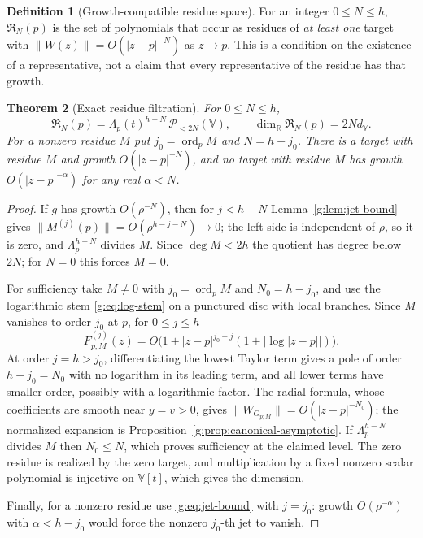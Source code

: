 \documentclass[11pt,a4paper]{article}
\numberwithin{equation}{section}
\newtheorem{theorem}{Theorem}[section]
\theoremstyle{definition}
\newtheorem{definition}[theorem]{Definition}
\theoremstyle{remark}
\theoremstyle{plain}
\newcommand{\RR}{\mathbb R}
\newcommand{\abs}[1]{\lvert #1\rvert}
\newcommand{\norm}[1]{\lVert #1\rVert}
\newcommand{\VV}{\mathbb V}                       %
\newcommand{\dV}{d_{\VV}}                         %
\newcommand{\Pol}[1]{\mathscr P_{<#1}(\VV)}       %
\newcommand{\Rq}{\Lambda}                         %
\newcommand{\Rfilt}{\mathfrak R}                  %
\DeclareMathOperator{\ord}{ord}
\begin{document}
\begin{definition}[Growth-compatible residue space]
\label{g:def:residue-space}
For an integer $0\le N\le h$, $\Rfilt_N(p)$ is the set of polynomials that occur
as residues of \emph{at least one} target with
$\norm{W(z)}=O(\abs{z-p}^{-N})$ as $z\to p$. This is a condition on the
existence of a representative, not a claim that every representative of the
residue has that growth.
\end{definition}

\begin{theorem}[Exact residue filtration]
\label{g:thm:filtration}
For $0\le N\le h$,
\begin{equation}\label{g:eq:filtration}
 \Rfilt_N(p)=\Rq_p(t)^{h-N}\,\Pol{2N},\qquad
 \dim_\RR\Rfilt_N(p)=2N\dV .
\end{equation}
For a nonzero residue $M$ put $j_0=\ord_pM$ and $N=h-j_0$. There is a target
with residue $M$ and growth $O(\abs{z-p}^{-N})$, and no target with residue
$M$ has growth $O(\abs{z-p}^{-\alpha})$ for any real $\alpha<N$.
\end{theorem}

\begin{proof}
If $g$ has growth $O(\rho^{-N})$, then for $j<h-N$ Lemma~\ref{g:lem:jet-bound}
gives $\norm{M^{(j)}(p)}=O(\rho^{h-j-N})\to0$; the left side is independent of
$\rho$, so it is zero, and $\Rq_p^{h-N}$ divides $M$. Since $\deg M<2h$ the
quotient has degree below $2N$; for $N=0$ this forces $M=0$.

For sufficiency take $M\ne0$ with $j_0=\ord_pM$ and $N_0=h-j_0$, and use the
logarithmic stem \eqref{g:eq:log-stem} on a punctured disc with local
branches. Since $M$ vanishes to order $j_0$ at $p$, for $0\le j\le h$
\[
 F_{p;M}^{(j)}(z)=O\bigl(1+\abs{z-p}^{j_0-j}(1+\abs{\log\abs{z-p}})\bigr).
\]
At order $j=h>j_0$, differentiating the lowest Taylor term gives a pole of
order $h-j_0=N_0$ with no logarithm in its leading term, and all lower terms
have smaller order, possibly with a logarithmic factor. The radial formula,
whose coefficients are smooth near $y=v>0$, gives
$\norm{W_{G_{p;M}}}=O(\abs{z-p}^{-N_0})$; the normalized expansion is
Proposition~\ref{g:prop:canonical-asymptotic}. If $\Rq_p^{h-N}$ divides $M$
then $N_0\le N$, which proves sufficiency at the claimed level. The zero
residue is realized by the zero target, and multiplication by a fixed nonzero
scalar polynomial is injective on $\VV[t]$, which gives the dimension.

Finally, for a nonzero residue use \eqref{g:eq:jet-bound} with $j=j_0$: growth
$O(\rho^{-\alpha})$ with $\alpha<h-j_0$ would force the nonzero $j_0$-th jet
to vanish.
\end{proof}
\end{document}
